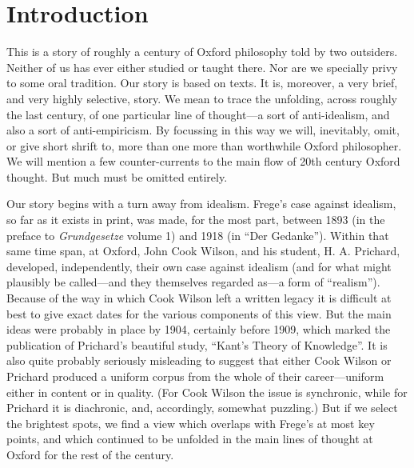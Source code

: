 \section{Introduction} %
\label{sec:introduction}

This is a story of roughly a century of Oxford philosophy told by two outsiders. Neither of us has ever either studied or taught there. Nor are we specially privy to some oral tradition. Our story is based on texts. It is, moreover, a very brief, and very highly selective, story.  We mean to trace the unfolding, across roughly the last century, of one particular line of thought---a sort of anti-idealism, and also a sort of anti-empiricism. By focussing in this way we will, inevitably, omit, or give short shrift to, more than one more than worthwhile Oxford philosopher. We will mention a few counter-currents to the main flow of 20th century Oxford thought. But much must be omitted entirely.

Our story begins with a turn away from idealism. Frege's case against idealism, so far as it exists in print, was made, for the most part, between 1893 (in the preface to \emph{Grundgesetze} volume 1) and 1918 (in ``Der Gedanke''). Within that same time span, at Oxford, John Cook Wilson, and his student, H. A. Prichard, developed, independently, their own case against idealism (and for what might plausibly be called---and they themselves regarded as---a form of ``realism''). Because of the way in which Cook Wilson left a written legacy it is difficult at best to give exact dates for the various components of this view. But the main ideas were probably in place by 1904, certainly before 1909, which marked the publication of Prichard’s beautiful study, ``Kant’s Theory of Knowledge''. It is also quite probably seriously misleading to suggest that either Cook Wilson or Prichard produced a uniform corpus from the whole of their career---uniform either in content or in quality. (For Cook Wilson the issue is synchronic, while for Prichard it is diachronic, and, accordingly, somewhat puzzling.) But if we select the brightest spots, we find a view which overlaps with Frege’s at most key points, and which continued to be unfolded in the main lines of thought at Oxford for the rest of the century.


